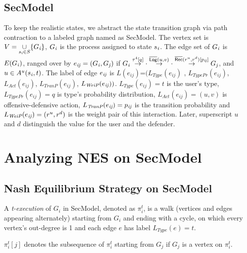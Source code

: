 \documentclass[10pt, conference, compsocconf]{IEEEtran}
\begin{document}
\subsection{SecModel}
To keep the realistic states,
we abstract the state transition graph via path contraction \cite{reinhard} to a labeled graph named as SecModel.
The vertex set is $V=\underset{s_{\it i}\in S}{\cup}\{G_{\it i}\}$, $G_{\it i}$ is the process assigned to state $s_{\it i}$.
The edge set of $G_{\it i}$ is $E(G_{\it i})$, ranged over by $e_{\it ij}=(G_{\it i},G_{\it j})$ if $G_{\it i}\stackrel{\tau^4[q]}{\rightarrow}\cdot\stackrel{\overline{{\sf Log}}(u,v)}{\rightarrow}\cdot\stackrel{\overline{{\sf Rec}}(r^u,r^d)[p_{\it ij}]}{\rightarrow}G_{\it j}$, and $u\in A^u(s_{\it i},t)$.
The label of edge $e_{\it ij}$ is $L(e_{\textit{ij}})$=$(L_{\textit{Type}}(e_{\textit{ij}})$ , $L_{\textit{TypePr}}(e_{\textit{ij}})$, $L_{\textit{Act}}(e_{\textit{ij}})$,  $L_{\textit{TranP}}(e_{\textit{ij}})$, $L_{\textit{WeiP}}(e_{\it ij}))$. $L_{\textit{Type}}(e_{\textit{ij}})=t$ is the user's type, $L_{\textit{TypePr}}(e_{\textit{ij}})=q$ is type's probability distribution, $L_{\textit{Act}}(e_{\textit{ij}})=(u,v)$ is offensive-defensive action, $L_{\textit{TranP}}(e_{\textit{ij}})=p_{\it ij}$ is the transition probability and $L_{\textit{WeiP}}(e_{\it ij})=(r^u,r^d)$ is the weight pair of this interaction. Later, superscript $u$ and $d$ distinguish the value for the user and the defender.

\section{Analyzing NES on SecModel}
\subsection{Nash Equilibrium Strategy on SecModel}
\begin{definition}
A \textit{t-execution} of $G_{\textit{i}}$ in {\rm SecModel}, denoted as $\pi_{\textit{i}}^{t}$, is a walk (vertices and edges appearing alternately) starting from $G_{\textit{i}}$ and ending with a cycle, on which every vertex's out-degree is 1 and each edge $e$ has label $L_{\textit{Type}}(e)=t$.
\end{definition}

$\pi_{\textit{i}}^{t}[j]$ denotes the subsequence of $\pi_{\textit{i}}^{t}$ starting from $G_{\textit{j}}$ if $G_{\textit{j}}$ is a vertex on $\pi_{\textit{i}}^{t}$.
\end{document}
